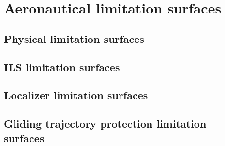 \chapter{Aeronautical limitation surfaces}

	\section{Physical limitation surfaces}
	
	\section{ILS limitation surfaces}
		\section{Localizer limitation surfaces}
		\section{Gliding trajectory protection limitation surfaces}
